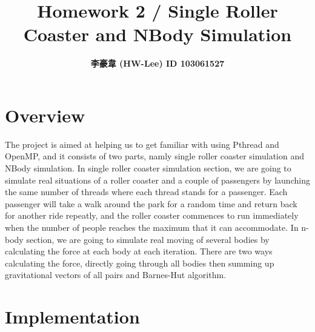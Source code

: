 \documentclass[12pt]{article}
\title{\textbf{ Homework 2 /  Single Roller Coaster and NBody Simulation }}
\author{\textbf{李豪韋 (HW-Lee) ID 103061527}}
\date{}
\begin{document}
\vspace*{-60pt}
{\let\newpage\relax\maketitle}
\thispagestyle{title}

\vspace{-50pt}
\section*{Overview}
\vspace{-20pt}
\noindent\makebox[\linewidth]{\rule{\textwidth}{0.4pt}}
\vspace{5pt}

The project is aimed at helping us to get familiar with using Pthread and OpenMP, and it consists of two parts, namly single roller coaster simulation and NBody simulation. In single roller coaster simulation section, we are going to simulate real situations of a roller coaster and a couple of passengers by launching the same number of threads where each thread stands for a passenger. Each passenger will take a walk around the park for a random time and return back for another ride repeatly, and the roller coaster commences to run immediately when the number of people reaches the maximum that it can accommodate. In n-body section, we are going to simulate real moving of several bodies by calculating the force at each body at each iteration. There are two ways calculating the force, directly going through all bodies then summing up gravitational vectors of all pairs and Barnes-Hut algorithm.

\section*{Implementation}
\vspace{-20pt}
\noindent\makebox[\linewidth]{\rule{\textwidth}{0.4pt}}
\end{document}
